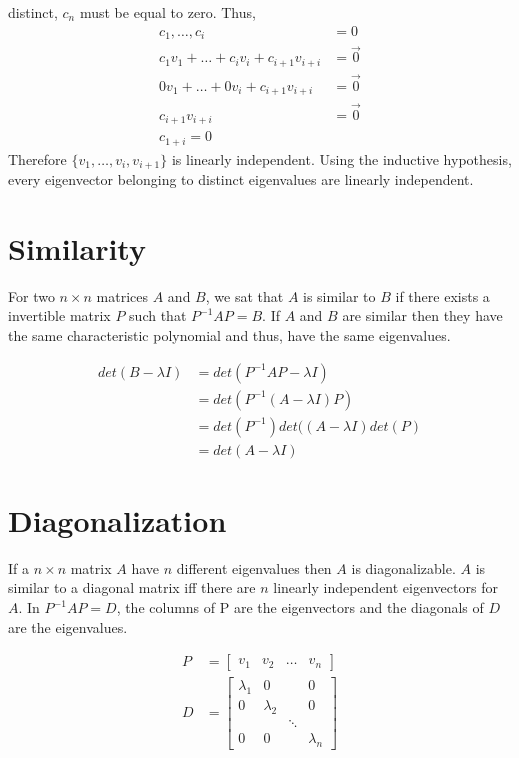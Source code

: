 \documentclass{article}
\theoremstyle{mytheoremstyle}
\theoremstyle{mytheoremstyle}
\theoremstyle{myproblemstyle}
\begin{document}
    distinct, $c_n$ must be equal to zero. Thus,
    \begin{align*}
        c_1,\dots,c_i &= 0 \\
        c_1v_1 + \dots + c_iv_i + c_{i+1}v_{i+i} &= \vec{0} \\
        0v_1 + \dots + 0v_i + c_{i+1}v_{i+i} &= \vec{0} \\
        c_{i+1}v_{i+i} &= \vec{0} \\
        c_{1+i} = 0
    \end{align*}
    Therefore $\{v_1,\dots,v_i,v_{i+1}\}$ is linearly independent. Using the
    inductive hypothesis, every eigenvector belonging to distinct eigenvalues
    are linearly independent.

    \section*{Similarity}
    For two $n\times n$ matrices $A$ and $B$, we sat that $A$ is similar to $B$
    if there exists a invertible matrix $P$ such that $P^{-1}AP=B$. If $A$ and
    $B$ are similar then they have the same characteristic polynomial and thus,
    have the same eigenvalues.

    \begin{align*}
        det(B-\lambda I) &= det(P^{-1}AP - \lambda I) \\
        &= det(P^{-1}(A- \lambda I)P ) \\
        &= det(P^{-1})det((A- \lambda I )det(P) \\
        &= det(A- \lambda I )
    \end{align*}

    \section*{Diagonalization}
    If a $n\times n$ matrix $A$ have $n$ different eigenvalues
    then $A$ is diagonalizable. $A$ is similar to a diagonal matrix iff there
    are $n$ linearly independent eigenvectors for $A$. In $P^{-1}AP=D$, the
    columns of P are the eigenvectors and the diagonals of $D$ are the
    eigenvalues.

    \begin{align*}
        P &= \begin{bmatrix}
            v_1 & v_2 & \dots & v_n
        \end{bmatrix} \\
        D &= \begin{bmatrix}
            \lambda_1 & 0 & & 0 \\
            0 & \lambda_2 & & 0 \\
              &   & \ddots &   \\
            0 & 0 &   & \lambda_n
        \end{bmatrix}
    \end{align*}
\end{document}
